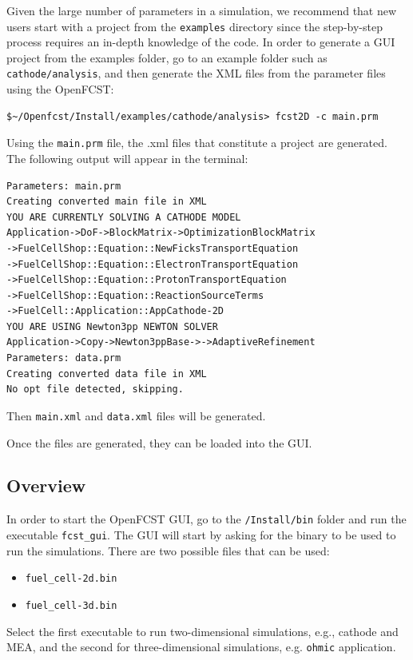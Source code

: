 Given the large number of parameters in a simulation, we recommend that new users start with a project from the \texttt{examples} directory since the step-by-step process requires an in-depth knowledge of the code. In order to generate a GUI project from the examples folder, go to an example folder such as \texttt{cathode/analysis}, and then generate the XML files from the parameter files using the OpenFCST:
\begin{lstlisting}
$~/Openfcst/Install/examples/cathode/analysis> fcst2D -c main.prm 
\end{lstlisting}

Using the \texttt{main.prm} file, the .xml files that constitute a project are generated. The following output will appear in the terminal:
\begin{lstlisting}
Parameters: main.prm
Creating converted main file in XML
YOU ARE CURRENTLY SOLVING A CATHODE MODEL
Application->DoF->BlockMatrix->OptimizationBlockMatrix
->FuelCellShop::Equation::NewFicksTransportEquation
->FuelCellShop::Equation::ElectronTransportEquation
->FuelCellShop::Equation::ProtonTransportEquation
->FuelCellShop::Equation::ReactionSourceTerms
->FuelCell::Application::AppCathode-2D
YOU ARE USING Newton3pp NEWTON SOLVER
Application->Copy->Newton3ppBase->->AdaptiveRefinement
Parameters: data.prm
Creating converted data file in XML
No opt file detected, skipping.
\end{lstlisting}
Then \texttt{main.xml} and \texttt{data.xml} files will be generated.
 
Once the files are generated, they can be loaded into the GUI.

\subsection{Overview}

In order to start the OpenFCST GUI, go to the \texttt{/Install/bin} folder and run the executable \texttt{fcst\_gui}. The GUI will start by asking for the binary to be used to run the simulations. There are two possible files that can be used:
\begin{itemize}
 \item \texttt{fuel\_cell-2d.bin}
 \item \texttt{fuel\_cell-3d.bin}
\end{itemize}
Select the first executable to run two-dimensional simulations, e.g., cathode and MEA, and the second for three-dimensional simulations, e.g. \texttt{ohmic} application.

